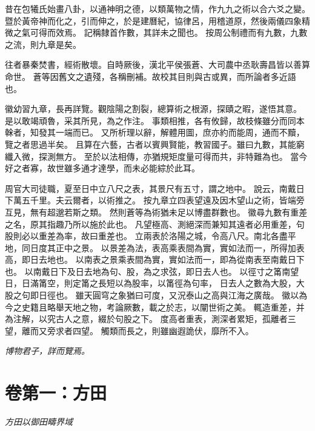 \documentclass[11pt,a4paper]{article}
\begin{document}
昔在包犧氏始畫八卦，以通神明之德，以類萬物之情，作九九之術以合六爻之變。
暨於黃帝神而化之，引而伸之，於是建曆紀，協律呂，用稽道原，然後兩儀四象精微之氣可得而效焉。
記稱隸首作數，其詳未之聞也。
按周公制禮而有九數，九數之流，則九章是矣。

往者暴秦焚書，經術散壞。自時厥後，漢北平侯張蒼、大司農中丞耿壽昌皆以善算命世。
蒼等因舊文之遺殘，各稱刪補。故校其目則與古或異，而所論者多近語也。

徽幼習九章，長再詳覽。觀陰陽之割裂，總算術之根源，探賾之暇，遂悟其意。
是以敢竭頑魯，采其所見，為之作注。
事類相推，各有攸歸，故枝條雖分而同本榦者，知發其一端而已。
又所析理以辭，解體用圖，庶亦約而能周，通而不黷，覽之者思過半矣。
且算在六藝，古者以賓興賢能，教習國子。雖曰九數，其能窮纖入微，探測無方。
至於以法相傳，亦猶規矩度量可得而共，非特難為也。
當今好之者寡，故世雖多通才達學，而未必能綜於此耳。

周官大司徒職，夏至日中立八尺之表，其景尺有五寸，謂之地中。
說云，南戴日下萬五千里。夫云爾者，以術推之。
按九章立四表望遠及因木望山之術，皆端旁互見，無有超邈若斯之類。
然則蒼等為術猶未足以博盡群數也。
徽尋九數有重差之名，原其指趣乃所以施於此也。
凡望極高、測絕深而兼知其遠者必用重差，句股則必以重差為率，故曰重差也。
立兩表於洛陽之城，令高八尺。南北各盡平地，同日度其正中之景。
以景差為法，表高乘表間為實，實如法而一，所得加表高，即日去地也。
以南表之景乘表間為實，實如法而一，即為從南表至南戴日下也。
以南戴日下及日去地為句、股，為之求弦，即日去人也。
以徑寸之筩南望日，日滿筩空，則定筩之長短以為股率，以筩徑為句率，
日去人之數為大股，大股之句即日徑也。
雖天圓穹之象猶曰可度，又況泰山之高與江海之廣哉。
徽以為今之史籍且略舉天地之物，考論厥數，載之於志，以闡世術之美。
輒造重差，并為注解，以究古人之意，綴於句股之下。
度高者重表，測深者累矩，孤離者三望，離而又旁求者四望。
觸類而長之，則雖幽遐詭伏，靡所不入。

\begin{flushright}
\textit{博物君子，詳而覽焉。}
\end{flushright}

\newpage


\section{卷第一：方田}
\label{sec:fangtian}

\begin{center}
\textit{方田以御田疇界域}
\end{center}
\end{document}
